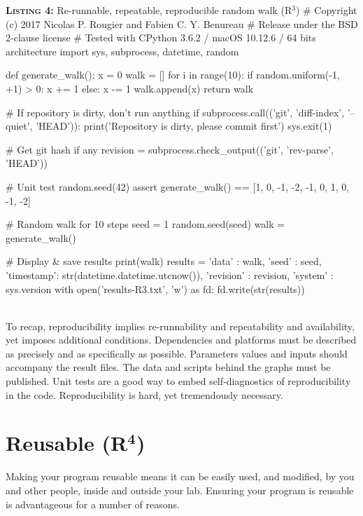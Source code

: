 \documentclass[a4paper,11pt]{article}
\begin{document}
\noindent \begin{minipage}[c]{\linewidth}
\begin{code}{\textbf{\textsc{Listing 4:}} Re-runnable, repeatable, reproducible random walk (R$^3$)}
# Copyright (c) 2017 Nicolas P. Rougier and Fabien C. Y. Benureau
# Release under the BSD 2-clause license
# Tested with CPython 3.6.2 / macOS 10.12.6 / 64 bits architecture
import sys, subprocess, datetime, random

def generate_walk():
    x = 0
    walk = []
    for i in range(10):
        if random.uniform(-1, +1) > 0:
            x += 1
        else:
            x -= 1
        walk.append(x)
    return walk

# If repository is dirty, don't run anything
if subprocess.call(('git', 'diff-index', '--quiet', 'HEAD')):
    print('Repository is dirty, please commit first')
    sys.exit(1)

# Get git hash if any
revision = subprocess.check_output(('git', 'rev-parse', 'HEAD'))

# Unit test
random.seed(42)
assert generate_walk() == [1, 0, -1, -2, -1, 0, 1, 0, -1, -2]

# Random walk for 10 steps
seed = 1
random.seed(seed)
walk = generate_walk()

# Display & save results
print(walk)
results = {'data'     : walk,
           'seed'     : seed,
           'timestamp': str(datetime.datetime.utcnow()),
           'revision' : revision,
           'system'   : sys.version}
with open('results-R3.txt', 'w') as fd:
    fd.write(str(results))
\end{code}
\end{minipage}\\

To recap, reproducibility implies re-runnability and repeatability and availability, yet imposes additional conditions. Dependencies and platforms must be described as precisely and as specifically as possible. Parameters values and inputs should accompany the result files. The data and scripts behind the graphs must be published. Unit tests are a good way to embed self-diagnostics of reproducibility in the code. Reproducibility is hard, yet tremendously necessary.


\section*{Reusable (R$^{\mathbf 4}$)}

Making your program reusable means it can be easily used, and modified, by you and other people, inside and outside your lab. Ensuring your program is reusable is advantageous for a number of reasons.\\
\end{document}

